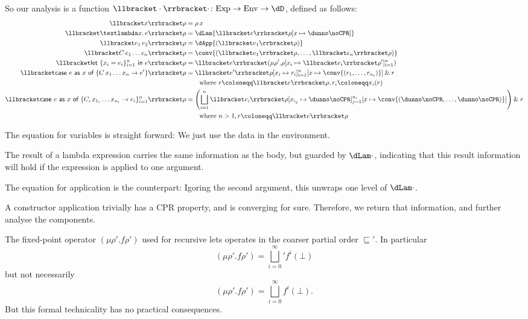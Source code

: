 \documentclass[parskip=half]{scrartcl}
\newcommand{\sExp}{\text{Exp}}
\newcommand{\sEnv}{\text{Env}}
\newcommand{\sem}[2]{\llbracket #1\rrbracket #2}
\newcommand{\sApp}[2]{#1\,#2}
\newcommand{\sLam}[2]{\text{\textlambda} #1.\, #2}
\newcommand{\sCase}[4]{\text{\textsf{case}}\ #1\  \textsf{as}\ #2\ \textsf{of}\ \{#3 \rightarrow #4\}_{i=1}^n}
\newcommand{\sPCase}[4]{\text{\textsf{case}}\ #1\  \textsf{as}\ #2\ \textsf{of}\ \{#3 \rightarrow #4\}}
\newcommand{\sLet}[3]{\text{\textsf{let}}\ \{#1 = #2\}_{i=1}^n\ \text{\textsf{in}}\ #3}
\newcommand{\both}[2]{#1\mathbin{\&}#2}
\begin{document}
So our analysis is a function $\sem{\cdot}\cdot \colon \sExp \to \sEnv \to \dD$, defined as follows:
%
\newcommand{\upd}[3]{#1[#2 \mapsto #3]}
%
\begin{align*}
\sem{x}\rho &= \sApp \rho x \\
\sem{\sLam x e}\rho &= \dLam{\sem e{\upd\rho x{\dunno\noCPR}}} \\
\sem{\sApp {e_1} {e_2}}\rho &= \dApp{(\sem{e_1}\rho)} \\
\sem{\sApp C {e_1\ldots e_n}}\rho &= \conv{(\sem{e_1}\rho, \ldots, \sem{e_n}\rho)} \\
\sem{\sLet {x_i}{e_i} e}\rho &= \sem{e}({\mu \rho'. \upd\rho{x_i}{\sem{e_i}{\rho'}}_{i=1}^n})\\
\sem{\sPCase e x {\sApp C {x_1}\ldots x_n} {e'}}\rho
	&= \both{
	     \sem{e'}{
		\upd{\upd\rho{x_i}{r_i}_{i=1}^{n}}}
		    {x}{\conv{(r_1,\ldots,r_{n_i})}}
	   }r\\
	   &\quad\quad \text{where }r \coloneqq \sem e\rho, r_i \coloneqq  \pi_i(r)\\
\sem{\sCase e x {\sApp {C_i} {x_{1_i}\ldots x_{n_i}}} {e_i}}\rho
	&= \both{\left(
	     \bigsqcup_{i=1}^n \sem{e_i}{
		\upd{\upd\rho{x_{i_j}}{\dunno\noCPR}_{j=1}^{n_i}}
		    {x}{\conv{(\dunno\noCPR,\ldots,\dunno\noCPR)}}}
	   \right)}r \\
	   &\quad\quad \text{where } n > 1, r \coloneqq \sem e\rho
\end{align*}

The equation for variables is straight forward: We just use the data in the environment.

The result of a lambda expression carries the same information as the body, but guarded by $\dLam \cdot$, indicating that this result information will hold if the expression is applied to one argument.

The equation for application is the counterpart: Igoring the second argument, this unwraps one level of $\dLam \cdot$.

A constructor application trivially has a CPR property, and is converging for sure. Therefore, we return that information, and further analyse the components.

The fixed-point operator $(\mu \rho'. f \rho')$ used for recursive lets operates in the coarser partial order $\sqsubseteq'$. In particular
\[
(\mu \rho'. f \rho') = {\bigsqcup_{i=0}^\infty}' f^i(\bot)
\]
but not necessarily
\[
(\mu \rho'. f \rho') = \bigsqcup_{i=0}^\infty f^i(\bot).
\]
But this formal technicality has no practical consequences.
\end{document}
